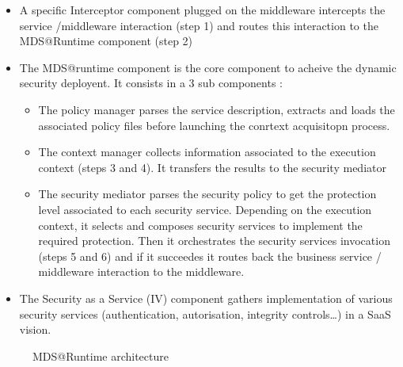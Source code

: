 \documentclass[runningheads,a4paper]{llncs}
\begin{document}
\begin{itemize}
\settowidth{\leftmargin}{{\Large$\square$}}\advance\leftmargin{}
\itemsep5pt\relax
\renewcommand\labelitemi{{\lower1.5pt\hbox{\Large$\square$}}}
\item A specific Interceptor component plugged on the middleware intercepts the service /middleware interaction (step 1) and routes this interaction to the MDS@Runtime component (step 2) 
\item	The MDS@runtime component  is the core component to acheive the dynamic security deployent. It consists in a 3 sub components : 
\begin{itemize}
\item	The policy manager parses the service description, extracts and loads the associated policy files before launching the conrtext acquisitopn process.
\item The context manager collects information associated to the execution context (steps 3 and 4). It transfers the results to the security mediator
\item	The security mediator parses the security policy to get the protection level associated to each security service. Depending on the execution context, it selects and composes security services to implement the required protection. Then it orchestrates the security services invocation (steps 5 and 6) and if it succeedes it routes back the business service / middleware interaction to the middleware.
\end{itemize}
\item The Security as a Service (IV) component gathers implementation of various security services (authentication, autorisation, integrity controls…) in a SaaS vision.
\end{itemize}
\begin{figure}
    \centering
    \caption{MDS@Runtime architecture}
    \label{fig :archi}
\end{figure}
\end{document}
